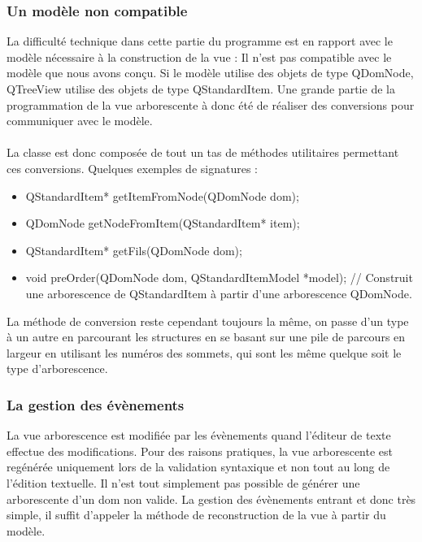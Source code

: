 \subsubsection{Un modèle non compatible}


La difficulté technique dans cette partie du programme est en rapport avec le modèle nécessaire à la construction de la vue :
Il n'est pas compatible avec le modèle que nous avons conçu. Si le modèle utilise des objets de type QDomNode, QTreeView utilise des objets de type QStandardItem. Une grande partie de la programmation de la vue arborescente à donc été de réaliser des conversions pour communiquer avec le modèle.
\paragraph{}

La classe est donc composée de tout un tas de méthodes utilitaires permettant ces conversions. Quelques exemples de signatures :
\begin{itemize}
\item QStandardItem* getItemFromNode(QDomNode dom);
\item QDomNode getNodeFromItem(QStandardItem* item);
\item QStandardItem* getFils(QDomNode dom);
\item void preOrder(QDomNode dom, QStandardItemModel *model); // Construit une arborescence de QStandardItem à partir d'une arborescence QDomNode.
\end{itemize}

La méthode de conversion reste cependant toujours la même, on passe d'un type à un autre en parcourant les structures en se basant
sur une pile de parcours en largeur en utilisant les numéros des sommets, qui sont les même quelque soit le type d'arborescence.

\subsubsection{La gestion des évènements}

La vue arborescence est modifiée par les évènements quand l'éditeur de texte effectue des modifications.
Pour des raisons pratiques, la vue arborescente est regénérée uniquement lors de la validation syntaxique et non tout au long de
l'édition textuelle. Il n'est tout simplement pas possible de générer une arborescente d'un dom non valide.
La gestion des évènements entrant et donc très simple, il suffit d'appeler la méthode de reconstruction de la vue à partir du modèle.
